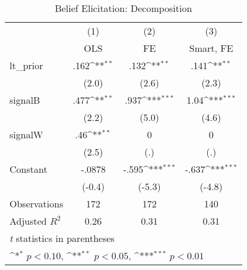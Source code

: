 \begin{table}[htbp]\centering
\def\sym#1{\ifmmode^{#1}\else\(^{#1}\)\fi}
\caption{Belief Elicitation: Decomposition}
\begin{tabular}{l*{3}{c}}
\hline\hline
                &\multicolumn{1}{c}{(1)}&\multicolumn{1}{c}{(2)}&\multicolumn{1}{c}{(3)}\\
                &\multicolumn{1}{c}{OLS}&\multicolumn{1}{c}{FE}&\multicolumn{1}{c}{Smart, FE}\\
\hline
lt\_prior        &     .162\sym{**} &     .132\sym{**} &     .141\sym{**} \\
                &    (2.0)         &    (2.6)         &    (2.3)         \\
signalB         &     .477\sym{**} &     .937\sym{***}&     1.04\sym{***}\\
                &    (2.2)         &    (5.0)         &    (4.6)         \\
signalW         &      .46\sym{**} &        0         &        0         \\
                &    (2.5)         &      (.)         &      (.)         \\
Constant        &   -.0878         &    -.595\sym{***}&    -.637\sym{***}\\
                &   (-0.4)         &   (-5.3)         &   (-4.8)         \\
\hline
Observations    &      172         &      172         &      140         \\
Adjusted \(R^{2}\)&     0.26         &     0.31         &     0.31         \\
\hline\hline
\multicolumn{4}{l}{\footnotesize \textit{t} statistics in parentheses}\\
\multicolumn{4}{l}{\footnotesize \sym{*} \(p<0.10\), \sym{**} \(p<0.05\), \sym{***} \(p<0.01\)}\\
\end{tabular}
\end{table}
